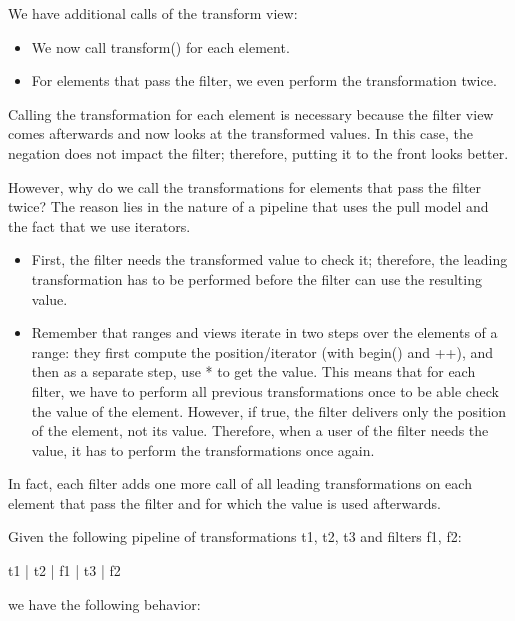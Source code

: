 We have additional calls of the transform view:

\begin{itemize}
\item
We now call transform() for each element.

\item
For elements that pass the filter, we even perform the transformation twice.
\end{itemize}

Calling the transformation for each element is necessary because the filter view comes afterwards and now looks at the transformed values. In this case, the negation does not impact the filter; therefore, putting it to the front looks better.

However, why do we call the transformations for elements that pass the filter twice? The reason lies in the nature of a pipeline that uses the pull model and the fact that we use iterators.

\begin{itemize}
\item
First, the filter needs the transformed value to check it; therefore, the leading transformation has to be performed before the filter can use the resulting value.
	
\item
Remember that ranges and views iterate in two steps over the elements of a range: they first compute the position/iterator (with begin() and ++), and then as a separate step, use * to get the value. This means that for each filter, we have to perform all previous transformations once to be able check the value of the element. However, if true, the filter delivers only the position of the element, not its value. Therefore, when a user of the filter needs the value, it has to perform the transformations once again.
\end{itemize}

In fact, each filter adds one more call of all leading transformations on each element that pass the filter and for which the value is used afterwards.

Given the following pipeline of transformations t1, t2, t3 and filters f1, f2:

\begin{cpp}
t1 | t2 | f1 | t3 | f2
\end{cpp}

we have the following behavior:

